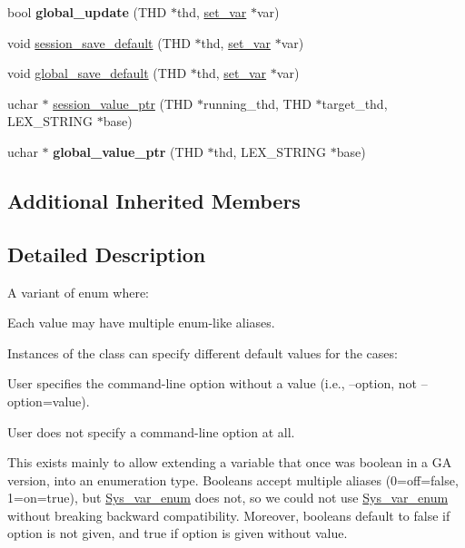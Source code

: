 \begin{DoxyCompactItemize}
\mbox{\label{classSys__var__multi__enum_ae498b94a10a8dd2e6714d1da1008a126}} 
bool {\bfseries global\+\_\+update} (T\+HD $\ast$thd, \mbox{\hyperlink{classset__var}{set\+\_\+var}} $\ast$var)
\item 
void \mbox{\hyperlink{classSys__var__multi__enum_a0590426cff9c64e48b5edef6791f218e}{session\+\_\+save\+\_\+default}} (T\+HD $\ast$thd, \mbox{\hyperlink{classset__var}{set\+\_\+var}} $\ast$var)
\item 
void \mbox{\hyperlink{classSys__var__multi__enum_ab563d457fe100f28b325665858d41253}{global\+\_\+save\+\_\+default}} (T\+HD $\ast$thd, \mbox{\hyperlink{classset__var}{set\+\_\+var}} $\ast$var)
\item 
uchar $\ast$ \mbox{\hyperlink{classSys__var__multi__enum_a70b21626366df65d6fa0b43b7d89b594}{session\+\_\+value\+\_\+ptr}} (T\+HD $\ast$running\+\_\+thd, T\+HD $\ast$target\+\_\+thd, L\+E\+X\+\_\+\+S\+T\+R\+I\+NG $\ast$base)
\item 
\mbox{\label{classSys__var__multi__enum_aea6028bb95f3995c261f01d40c826ede}} 
uchar $\ast$ {\bfseries global\+\_\+value\+\_\+ptr} (T\+HD $\ast$thd, L\+E\+X\+\_\+\+S\+T\+R\+I\+NG $\ast$base)
\end{DoxyCompactItemize}
\subsection*{Additional Inherited Members}


\subsection{Detailed Description}
A variant of enum where\+:
\begin{DoxyItemize}
\item Each value may have multiple enum-\/like aliases.
\item Instances of the class can specify different default values for the cases\+:
\begin{DoxyItemize}
\item User specifies the command-\/line option without a value (i.\+e., --option, not --option=value).
\item User does not specify a command-\/line option at all.
\end{DoxyItemize}
\end{DoxyItemize}

This exists mainly to allow extending a variable that once was boolean in a GA version, into an enumeration type. Booleans accept multiple aliases (0=off=false, 1=on=true), but \mbox{\hyperlink{classSys__var__enum}{Sys\+\_\+var\+\_\+enum}} does not, so we could not use \mbox{\hyperlink{classSys__var__enum}{Sys\+\_\+var\+\_\+enum}} without breaking backward compatibility. Moreover, booleans default to false if option is not given, and true if option is given without value.

